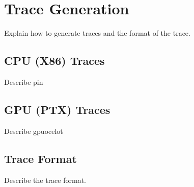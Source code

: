 
\clearpage
\section{Trace Generation}

Explain how to generate traces and the format of the trace.

\subsection{CPU (X86) Traces}

Describe pin

\subsection{GPU (PTX) Traces}

Describe gpuocelot

\subsection{Trace Format}

Describe the trace format.




